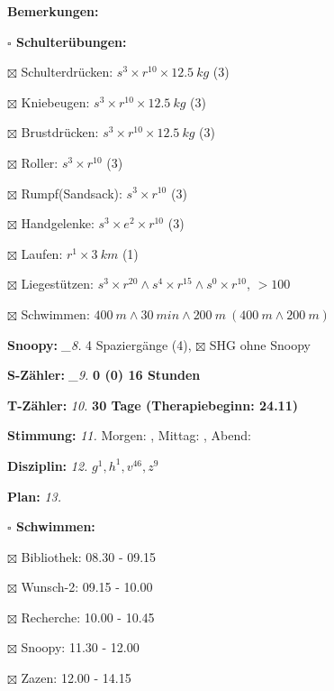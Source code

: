 \documentclass[10pt,a4paper]{article}
\newcommand\prop[1] {{\color {alizarin} {\bf #1}}}             %
\newcommand\rewo[1] {{\color {aqua} {\bf #1}}}                 %
\newcommand\down[1] {{\color {lime(web)(x11green)} {\bf #1}}}  %
\newcommand\mand[1] {{\color {burntorange} {\bf #1}}}          %
\newcommand\topspace{\vskip -15pt \hskip 20pt}
\newcommand\bottomspace{\vskip 4pt}
\newcommand\n[1] { {\sl #1.} \hskip 5pt }
\begin{document}
\begin{mdframed}[style=daystyle]
\begin{labeling}{{\mand {Bemerkungen:}}}
\begin{minipage}{0.75\textwidth}
\begin{labeling}{\prop {$\square$ {Schulterübungen:}}}
      \item[$\boxtimes$ Schulterdrücken:] $s^3 \times r^{10} \times 12.5\ kg$ (3)
      \item[$\boxtimes$ Kniebeugen:]      $s^3 \times r^{10} \times 12.5\ kg$ (3)
      \item[$\boxtimes$ Brustdrücken:]    $s^3 \times r^{10} \times 12.5\ kg$ (3)
      \item[$\boxtimes$ Roller:]          $s^3 \times r^{10}$ (3)
      \item[$\boxtimes$ Rumpf(Sandsack):] $s^3 \times r^{10}$ (3)
      \item[$\boxtimes$ Handgelenke:]     $s^3 \times e^2 \times r^{10}$ (3)
      \item[$\boxtimes$ Laufen:]          $r^1 \times 3\ km$ (1)
      \item[$\boxtimes$ Liegestützen:]    $s^3 \times r^{20} \land s^4 \times r^{15} \land s^0 \times r^{10}$, $> 100$
      \item[$\boxtimes$ Schwimmen:]       $400\ m \land 30\ min \land 200\ m\ (400\ m \land 200\ m)$
      \end{labeling}
    \end{minipage}
    \bottomspace        
  \item[{\mand {Snoopy:}}]        \n{\_8} 4 Spaziergänge (4), $\boxtimes$ SHG ohne Snoopy
  \item[{\mand {S-Zähler:}}]      \n{\_9} {\rewo {0 (0) 16 Stunden}}
  \item[{\mand {T-Zähler:}}]       \n{10} {\down {30 Tage (Therapiebeginn: 24.11)}}
  \item[{\mand {Stimmung:}}]       \n{11} Morgen: , Mittag: , Abend: 
  \item[{\mand {Disziplin:}}]      \n{12} $g^{1}, h^{1}, v^{46}, z^{9}$
  \item[{\mand {Plan:}}]           \n{13}
    \topspace
    \begin{minipage}{0.75\textwidth}  
      \begin{labeling}{\prop {$\square$ {Schwimmen:}}} 
        \setlength\itemsep{-3pt}
      \item[$\boxtimes$ Bibliothek:] 08.30 - 09.15
      \item[$\boxtimes$ Wunsch-2:]   09.15 - 10.00
      \item[$\boxtimes$ Recherche:]  10.00 - 10.45
      \item[$\boxtimes$ Snoopy:]     11.30 - 12.00
      \item[$\boxtimes$ Zazen:]      12.00 - 14.15

\end{labeling}
\end{minipage}
\end{labeling}
\end{mdframed}
\end{document}
